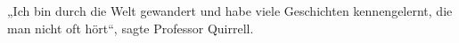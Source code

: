 „Ich bin durch die Welt gewandert und habe viele Geschichten kennengelernt, die man nicht oft hört“, sagte Professor Quirrell.
